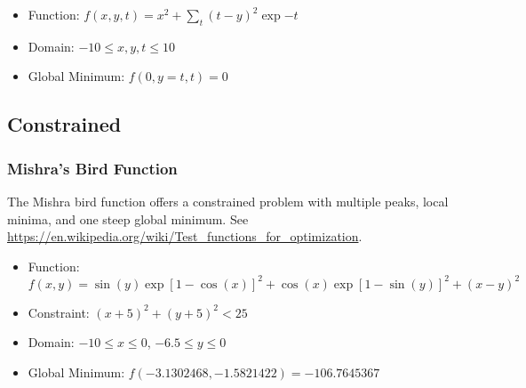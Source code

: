 \begin{itemize}
  \item Function: $f(x,y,t) = x^2 + \sum_{t} (t-y)^2 \exp{-t}$
  \item Domain: $-10 \leq x,y,t \leq 10$
  \item Global Minimum: $f(0,y=t,t) = 0$
\end{itemize}



\subsection{Constrained}
\subsubsection{Mishra's Bird Function}
The Mishra bird function offers a constrained problem with multiple peaks, local minima, and one steep global
minimum.
See \url{https://en.wikipedia.org/wiki/Test_functions_for_optimization}.

\begin{itemize}
  \item Function: $f(x,y) = \sin(y)\exp[1-\cos(x)]^2 + \cos(x)\exp[1-\sin(y)]^2 + (x-y)^2$
  \item Constraint: $(x+5)^2 + (y+5)^2 < 25$
  \item Domain: $-10 \leq x \leq 0$, $-6.5 \leq y \leq 0$
  \item Global Minimum: $f(-3.1302468, -1.5821422) = -106.7645367$
\end{itemize}
